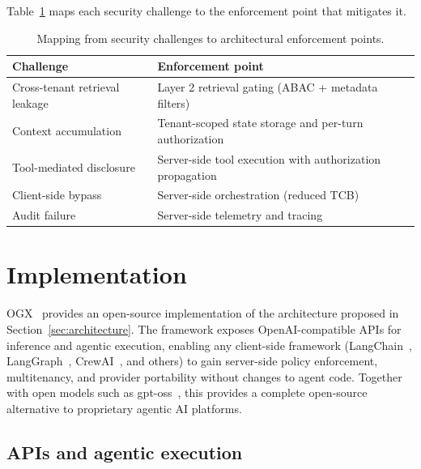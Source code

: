 \documentclass[sigconf]{acmart}
\begin{document}
Table~\ref{tab:enforcement} maps each security challenge to the enforcement point that mitigates it.

\begin{table}[!htbp]
  \centering
  \small
  \setlength{\tabcolsep}{3pt}
  \renewcommand{\arraystretch}{1.1}
  \begin{tabularx}{\columnwidth}{@{}l|X@{}}
  \toprule
  Challenge & Enforcement point \\
  \midrule
  Cross-tenant retrieval leakage & Layer 2 retrieval gating (ABAC + metadata filters) \\
  \midrule
  Context accumulation & Tenant-scoped state storage and per-turn authorization \\
  \midrule
  Tool-mediated disclosure & Server-side tool execution with authorization propagation \\
  \midrule
  Client-side bypass & Server-side orchestration (reduced TCB) \\
  \midrule
  Audit failure & Server-side telemetry and tracing \\
  \bottomrule
  \end{tabularx}
  \caption{Mapping from security challenges to architectural enforcement points.}
  \label{tab:enforcement}
\end{table}


\section{Implementation}
\label{sec:implementation}

OGX~\cite{ogx} provides an open-source implementation of the architecture proposed in Section~\ref{sec:architecture}. The framework exposes OpenAI-compatible APIs for inference and agentic execution, enabling any client-side framework (LangChain~\cite{langchain}, LangGraph~\cite{langgraph}, CrewAI~\cite{crewai}, and others) to gain server-side policy enforcement, multitenancy, and provider portability without changes to agent code. Together with open models such as gpt-oss~\cite{openai2025gptoss120bgptoss20bmodel}, this provides a complete open-source alternative to proprietary agentic AI platforms.

\subsection{APIs and agentic execution}
\label{sec:apis}
\end{document}
